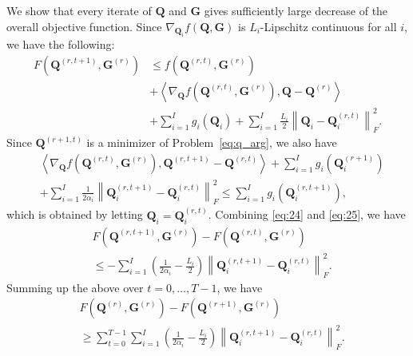 \documentclass[10pt,journal]{IEEEtran}
\newcommand{\G}{\boldsymbol{G}}
\newcommand{\Q}{\boldsymbol{Q}}
\begin{document}
We show that every iterate of $\Q$ and $\G$ gives sufficiently large decrease of the overall objective function.
Since $\nabla_{\Q_i}f(\Q,\G)$ is $L_i$-Lipschitz continuous for all $i$, we have the following:
\begin{align}
F(\Q^{(r,t+1)},\G^{(r)})&\leq f(\Q^{(r,t)},\G^{(r)}) \label{eq:24} \\
&+  \left<\nabla_{\Q}f(\Q^{(r,t)},\G^{(r)}),\Q -\Q^{(r)}\right> \nonumber\\
&  + \sum_{i=1}^Ig_i(\Q_i) + \sum_{i=1}^I\frac{L_i}{2}\left\|\Q_i-\Q_i^{(r,t)}\right\|_F^2. \nonumber
\end{align}
Since $\Q^{(r+1,t)}$ is a minimizer of Problem~\eqref{eq:q_arg}, we also have
\begin{align}\label{eq:25}
 &\left<\nabla_{\Q}f(\Q^{(r,t)},\G^{(r)}),\Q^{(r,t+1)} -\Q^{(r,t)}\right>+\sum_{i=1}^Ig_i(\Q_i^{(r+1)}) \nonumber\\
  &+ \sum_{i=1}^I\frac{1}{2\alpha_i}\left\|\Q_i^{(r,t+1)}-\Q_i^{(r,t)}\right\|_F^2 \leq  \sum_{i=1}^Ig_i(\Q_i^{(r,t+1)}),
\end{align}
which is obtained by letting $\Q_i=\Q_i^{(r,t)}$.
Combining \eqref{eq:24} and \eqref{eq:25}, we have
\begin{equation}\label{eq:suff_q0}
\begin{aligned}
&F(\Q^{(r,t+1)},\G^{(r)}) - F(\Q^{(r,t)},\G^{(r)}) \\
& \leq -\sum_{i=1}^I\left( \frac{1}{2\alpha_i} - \frac{L_i}{2} \right)\left\|\Q_i^{(r,t+1)}-\Q_i^{(r,t)}\right\|_F^2.
\end{aligned}
\end{equation}
Summing up the above over $t=0,\ldots,T-1$, we have
\begin{equation}\label{eq:suff_q}
\begin{aligned}
& F(\Q^{(r)},\G^{(r)}) - F(\Q^{(r+1)},\G^{(r)})\\
&\geq \sum_{t=0}^{T-1}\sum_{i=1}^I\left( \frac{1}{2\alpha_i} - \frac{L_i}{2} \right)\left\|\Q_i^{(r,t+1)}-\Q_i^{(r,t)}\right\|_F^2.
\end{aligned}
\end{equation}
\end{document}
